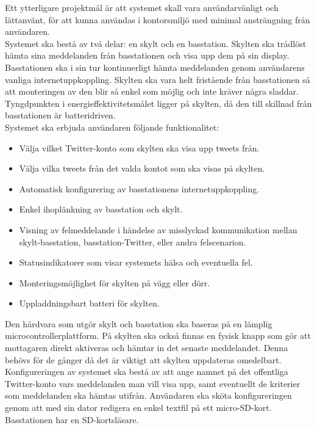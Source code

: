 \documentclass[a4paper,11pt]{article}
\begin{document}
Ett ytterligare projektmål är att systemet skall vara användarvänligt och lättanvänt, för att kunna användas i kontorsmiljö med minimal ansträngning från användaren.\\

Systemet ska bestå av två delar: en skylt och en basstation. Skylten ska trådlöst hämta sina meddelanden från basstationen och visa upp dem på sin display. Basstationen ska i sin tur kontinuerligt hämta meddelanden genom användarens vanliga internetuppkoppling. Skylten ska vara helt fristående från basstationen så att monteringen av den blir så enkel som möjlig och inte kräver några sladdar. Tyngdpunkten i energieffektivitetsmålet ligger på skylten, då den till skillnad från basstationen är batteridriven.\\

Systemet ska erbjuda användaren följande funktionalitet:
	\begin{itemize}
    	\item Välja vilket Twitter-konto som skylten ska visa upp tweets från.
    	\item Välja vilka tweets från det valda kontot som ska visas på skylten.
    	\item Automatisk konfigurering av basstationens internetuppkoppling.
    	\item Enkel ihoplänkning av basstation och skylt.
    	\item Visning av felmeddelande i händelse av misslyckad kommunikation mellan skylt-basstation, basstation-Twitter, eller andra felscenarion.
    	\item Statusindikatorer som visar systemets hälsa och eventuella fel.
    	\item Monteringsmöjlighet för skylten på vägg eller dörr.
    	\item Uppladdningsbart batteri för skylten.
    	\end{itemize}
    	
Den hårdvara som utgör skylt och basstation ska baseras på en lämplig microcontrollerplattform. På skylten ska också finnas en fysisk knapp som gör att mottagaren direkt aktiveras och hämtar in det senaste meddelandet. Denna behövs för de gånger då det är viktigt att skylten uppdateras omedelbart.\\

Konfigureringen av systemet ska bestå av att ange namnet på det offentliga Twitter-konto vars meddelanden man vill visa upp, samt eventuellt de kriterier som meddelanden ska hämtas utifrån. Användaren ska sköta konfigureringen genom att med sin dator redigera en enkel textfil på ett micro-SD-kort. Basstationen har en SD-kortsläsare.
\end{document}
